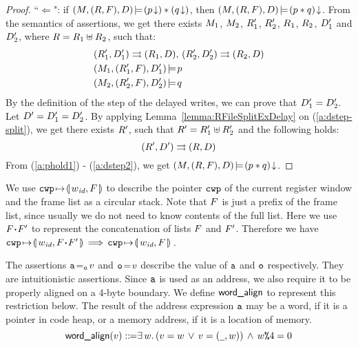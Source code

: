 {\begin{proof}
	``$\Leftarrow$": if 
	${(M,(R,F),D)}\!\models\!{({p}\!\downarrow)*({q}\!\downarrow)}$,
	then ${(M, (R, F), D)}\!\models\!{{(p*q)}\!\downarrow}$. 
	From the semantics of assertions, 
	we get there exists $M_1$, $M_2$, $R_1'$, 
	$R_2'$, $R_1$, $R_2$, $D_1'$ and $D_2'$, 
	where $R = R_1\uplus R_2$, such that:
	\begin{align}
		& {(R_1', D_1')}\rightrightarrows{(R_1, D)}, \, 
		{(R_2', D_2')}\rightrightarrows{(R_2, D)}
		\label{a:dstep-split} \\
		& {(M_1, (R_1', F), D_1')}\!\models\!{p}
		\label{a:phold1} \\
		& {(M_2, (R_2', F), D_2')}\!\models\!{q}
		\label{a:qhold2}
	\end{align}
	By the definition of the step of the 
	delayed writes, we can prove that 
	$D_1' = D_2'$. Let 
	$D' = D_1' = D_2'$. 
	By applying Lemma~\ref{lemma:RFileSplitExDelay} 
	on (\ref{a:dstep-split}), we get there exists 
	$R'$, such that $R' = R_1'\uplus R_2'$ 
	and the following holds:
	\begin{equation}
		{(R', D')}\rightrightarrows{(R, D)}
		\label{a:dstep2}	
	\end{equation}
	From (\ref{a:phold1}) - (\ref{a:dstep2}), we get 
	${(M, (R, F), D)}\!\models\!{{(p*q)}\!\downarrow}$.
\end{proof}
}

We use $\texttt{cwp}\!\mapsto\!\llparenthesis\, w_{\textit{id}},F\,\rrparenthesis$ to describe the pointer
$\texttt{cwp}$ of the current register window and the frame
list as a circular stack.
Note that $F$ is just a prefix of the frame list,
since usually we do not need to know contents of
the full list. Here we use $F \!\bm{\cdot}\! F'$ to
represent the concatenation of lists $F$ and $F'$.
Therefore we have
$
\texttt{cwp}\!\mapsto\!\llparenthesis\, w_{\textit{id}},F \!\bm{\cdot}\! F'\,\rrparenthesis \,\Longrightarrow\,
\texttt{cwp}\!\mapsto\!\llparenthesis\, w_{\textit{id}},F\,\rrparenthesis
$\,.


The assertions ${\texttt{a}}\!=_{a}\!{v}$ and ${\texttt{o}}\!=\!{v}$
describe the value of $\texttt{a}$ and $\texttt{o}$ respectively. They are
intuitionistic assertions. Since $\texttt{a}$ is used as an address,
we also require it to be properly aligned on a 4-byte boundary.
We define $\textsf{word\_align}{}$ to represent this restriction below.
The result of the address expression $\texttt{a}$ may be a word, if
it is a pointer in code heap, or a memory address, if it is a location
of memory.
\[
	\textsf{word\_align}{(v)} ::\!\!{=}
	\exists \, w. \,
	(v = w \, \lor \, v = (\underline{\ \,}, w))
	\, \land \, w\texttt{\%}{4} = 0
\]

